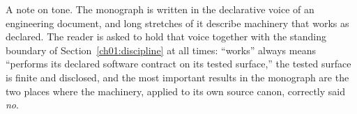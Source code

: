 A note on tone. The monograph is written in the declarative voice of an
engineering document, and long stretches of it describe machinery that
works as declared. The reader is asked to hold that voice together with the
standing boundary of Section~\ref{ch01:discipline} at all times: ``works''
always means ``performs its declared software contract on its tested
surface,'' the tested surface is finite and disclosed, and the most
important results in the monograph are the two places where the machinery,
applied to its own source canon, correctly said \emph{no}.
